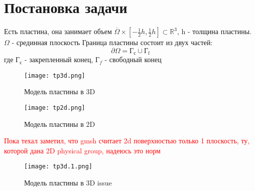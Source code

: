 \documentclass[a4paper,12pt]{article}
\begin{document}
\section{Постановка задачи}
Есть пластина, она занимает объем $\overline{\Omega} \times [-\frac{1}{2}h, \frac{1}{2}h] \subset \mathbb{R}^3$, h - толщина пластины. $\Omega$ - срединная плоскость Граница пластины состоит из двух частей:
\begin{equation}
    \partial \Omega = \text{Г}_{\text{с}} \cup \text{Г}_{\text{f}}
\end{equation}
где $\text{Г}_{\text{с}}$ - закрепленный конец, $\text{Г}_f$ - свободный конец
\begin{figure}[H]
	\begin{center}
		\texttt{[image: tp3d.png]}
		\caption{Модель пластины в 3D}
	\end{center}
\end{figure}

\begin{figure}[H]
	\begin{center}
		\texttt{[image: tp2d.png]}
		\caption{Модель пластины в 2D}
	\end{center}
\end{figure}
\textcolor{red}{Пока техал заметил, что gmsh считает 2d поверхностью только 1 плоскость, ту, которой дана 2D physical group, надеюсь это норм}
\begin{figure}[H]
	\begin{center}
		\texttt{[image: tp3d.1.png]}
		\caption{Модель пластины в 3D issue}
	\end{center}
\end{figure}
\end{document}
